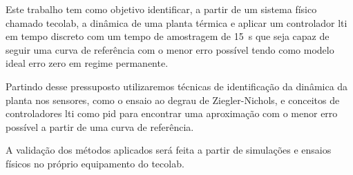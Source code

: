 Este trabalho tem como objetivo identificar, a partir de um sistema físico
chamado \gls{tecolab}, a dinâmica de uma planta térmica e aplicar um
controlador \gls{lti} em tempo discreto com um tempo de amostragem de
\SI{15}{\second} que seja capaz de seguir uma curva de referência com o menor
erro possível tendo como modelo ideal erro zero em regime permanente.

Partindo desse pressuposto utilizaremos técnicas de identificação da dinâmica da
planta nos sensores, como o ensaio ao degrau de Ziegler-Nichols, e conceitos de
controladores \gls{lti} como \gls{pid} para encontrar uma aproximação com o
menor erro possível a partir de uma curva de referência.

A validação dos métodos aplicados será feita a partir de simulações e ensaios físicos no próprio equipamento do \gls{tecolab}.
